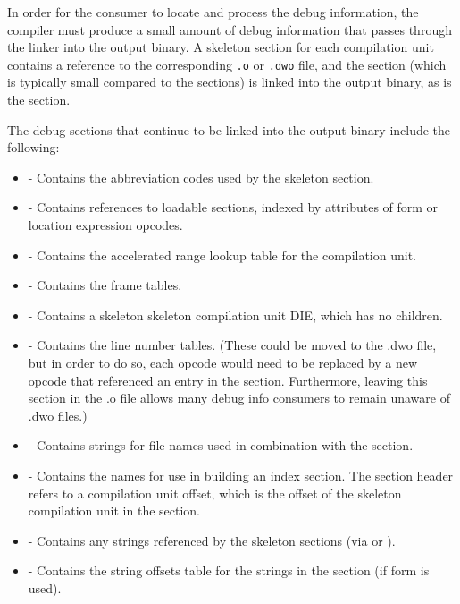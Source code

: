 In order for the consumer to locate and process the debug
information, the compiler must produce a small amount of debug
information that passes through the linker into the output
binary. A skeleton \dotdebuginfo{} section for each compilation unit
contains a reference to the corresponding \texttt{.o} or \texttt{.dwo}
file, and the \dotdebugline{} section (which is typically small
compared to the \dotdebuginfo{} sections) is
linked into the output binary, as is the \dotdebugaddr{} section.

The debug sections that continue to be linked into the
output binary include the following:
\begin{itemize}
\item
\dotdebugabbrev{} - Contains the abbreviation codes used by the
skeleton \dotdebuginfo{} section.
\item
\dotdebugaddr{} - Contains references to loadable sections,
indexed by attributes of form \DWFORMaddrx{} or location
expression 
\DWOPaddrx{} opcodes.
\item
\dotdebugaranges{} - Contains the accelerated range lookup table
for the compilation unit.
\item
\dotdebugframe{} - Contains the frame tables.
\item
\dotdebuginfo{} - Contains a skeleton 
skeleton compilation unit DIE, which has no children.
\item
\dotdebugline{} - Contains the line number tables.
(These could be moved to the .dwo file, but in
order to do so, each \DWLNEsetaddress{} opcode would need to
be replaced by a new opcode that referenced an entry in the
\dotdebugaddr{} section. Furthermore, leaving this section in the
.o file allows many debug info consumers to remain unaware of
.dwo files.)
\item
\dotdebuglinestr{} - Contains strings for file names used in
combination with the \dotdebugline{} section.
\item
\dotdebugnames{} - Contains the names for use in
building an index section. 
The section header refers to a
compilation unit offset, which is the offset of the
skeleton compilation unit in the \dotdebuginfo{} section.

\item
\dotdebugstr{} - Contains any strings referenced by the skeleton
\dotdebuginfo{} sections (via \DWFORMstrp{} or \DWFORMstrx{}).
\item
\dotdebugstroffsets{} - Contains the string offsets table for
the strings in the \dotdebugstr{} section (if form \DWFORMstrx{} is used).
\end{itemize}

